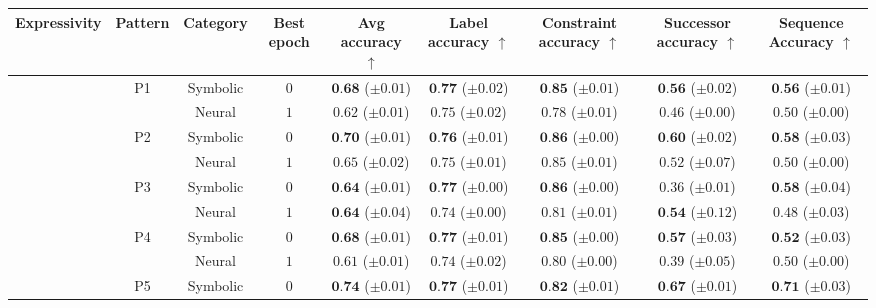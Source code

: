 \begin{table}[!t]
\centering
	\begin{tabular}{ccccccccc}
		\toprule
		Expressivity & Pattern & Category & Best epoch & Avg accuracy $\uparrow$ & Label accuracy $\uparrow$ & Constraint accuracy $\uparrow$ & Successor accuracy $\uparrow$ & Sequence Accuracy $\uparrow$\\
		\midrule
		\multirow{19}{*}{\rotatebox[origin=c]{90}{FOL}} & \multirow{2}{*}{P1} & Symbolic & $0$ & $\textbf{0.68} $ {\tiny ($\pm 0.01$)} & $\textbf{0.77} $ {\tiny ($\pm 0.02$)} & $\textbf{0.85} $ {\tiny ($\pm 0.01$)} & $\textbf{0.56} $ {\tiny ($\pm 0.02$)} & $\textbf{0.56} $ {\tiny ($\pm 0.01$)}\\
		&  & Neural & $1$ & $0.62 $ {\tiny ($\pm 0.01$)} & $0.75 $ {\tiny ($\pm 0.02$)} & $0.78 $ {\tiny ($\pm 0.01$)} & $0.46 $ {\tiny ($\pm 0.00$)} & $0.50 $ {\tiny ($\pm 0.00$)}\\
		\cmidrule{2-9}
		& \multirow{2}{*}{P2} & Symbolic & $0$ & $\textbf{0.70} $ {\tiny ($\pm 0.01$)} & $\textbf{0.76} $ {\tiny ($\pm 0.01$)} & $\textbf{0.86} $ {\tiny ($\pm 0.00$)} & $\textbf{0.60} $ {\tiny ($\pm 0.02$)} & $\textbf{0.58} $ {\tiny ($\pm 0.03$)}\\
		&  & Neural & $1$ & $0.65 $ {\tiny ($\pm 0.02$)} & $0.75 $ {\tiny ($\pm 0.01$)} & $0.85 $ {\tiny ($\pm 0.01$)} & $0.52 $ {\tiny ($\pm 0.07$)} & $0.50 $ {\tiny ($\pm 0.00$)}\\
		\cmidrule{2-9}
		& \multirow{2}{*}{P3} & Symbolic & $0$ & $\textbf{0.64} $ {\tiny ($\pm 0.01$)} & $\textbf{0.77} $ {\tiny ($\pm 0.00$)} & $\textbf{0.86} $ {\tiny ($\pm 0.00$)} & $0.36 $ {\tiny ($\pm 0.01$)} & $\textbf{0.58} $ {\tiny ($\pm 0.04$)}\\
		&  & Neural & $1$ & $\textbf{0.64} $ {\tiny ($\pm 0.04$)} & $0.74 $ {\tiny ($\pm 0.00$)} & $0.81 $ {\tiny ($\pm 0.01$)} & $\textbf{0.54} $ {\tiny ($\pm 0.12$)} & $0.48 $ {\tiny ($\pm 0.03$)}\\
		\cmidrule{2-9}
		& \multirow{2}{*}{P4} & Symbolic & $0$ & $\textbf{0.68} $ {\tiny ($\pm 0.01$)} & $\textbf{0.77} $ {\tiny ($\pm 0.01$)} & $\textbf{0.85} $ {\tiny ($\pm 0.00$)} & $\textbf{0.57} $ {\tiny ($\pm 0.03$)} & $\textbf{0.52} $ {\tiny ($\pm 0.03$)}\\
		&  & Neural & $1$ & $0.61 $ {\tiny ($\pm 0.01$)} & $0.74 $ {\tiny ($\pm 0.02$)} & $0.80 $ {\tiny ($\pm 0.00$)} & $0.39 $ {\tiny ($\pm 0.05$)} & $0.50 $ {\tiny ($\pm 0.00$)}\\
		\cmidrule{2-9}
		& \multirow{2}{*}{P5} & Symbolic & $0$ & $\textbf{0.74} $ {\tiny ($\pm 0.01$)} & $\textbf{0.77} $ {\tiny ($\pm 0.01$)} & $\textbf{0.82} $ {\tiny ($\pm 0.01$)} & $\textbf{0.67} $ {\tiny ($\pm 0.01$)} & $\textbf{0.71} $ {\tiny ($\pm 0.03$)}\\

\end{tabular}
\end{table}
